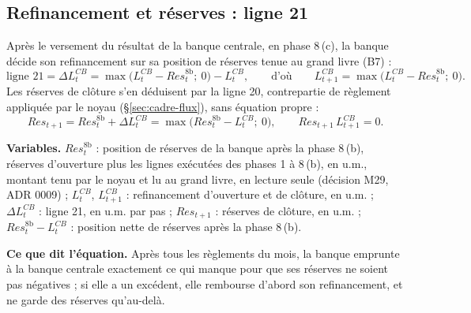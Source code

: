 \documentclass[11pt,a4paper]{article}
\newcommand{\variables}{\par\noindent\textbf{Variables.} }
\newcommand{\sens}{\par\noindent\textbf{Ce que dit l'équation.} }
\begin{document}
\subsection{Refinancement et réserves : ligne 21}
\label{sec:banque-refinancement}
\begin{proposee}
Après le versement du résultat de la banque centrale, en phase 8\,(c), la banque décide son refinancement sur sa position de réserves tenue au grand livre (B7) :
\begin{equation}
\text{ligne 21} = \Delta L^{\mathit{CB}}_t = \max\bigl(L^{\mathit{CB}}_t - \mathit{Res}^{8\mathrm{b}}_t ;\ 0\bigr) - L^{\mathit{CB}}_t, \qquad\text{d'où}\qquad L^{\mathit{CB}}_{t+1} = \max\bigl(L^{\mathit{CB}}_t - \mathit{Res}^{8\mathrm{b}}_t ;\ 0\bigr) . \tag{B7}\label{eq:banque-refinancement}
\end{equation}
Les réserves de clôture s'en déduisent par la ligne 20, contrepartie de règlement appliquée par le noyau (\S\ref{sec:cadre-flux}), sans équation propre :
\begin{equation*}
\mathit{Res}_{t+1} = \mathit{Res}^{8\mathrm{b}}_t + \Delta L^{\mathit{CB}}_t = \max\bigl(\mathit{Res}^{8\mathrm{b}}_t - L^{\mathit{CB}}_t ;\ 0\bigr), \qquad \mathit{Res}_{t+1}\, L^{\mathit{CB}}_{t+1} = 0 .
\end{equation*}
\begin{lecture}
\variables $\mathit{Res}^{8\mathrm{b}}_t$ : position de réserves de la banque après la phase 8\,(b), réserves d'ouverture plus les lignes exécutées des phases 1 à 8\,(b), en u.m., montant tenu par le noyau et lu au grand livre, en lecture seule (décision M29, ADR 0009) ; $L^{\mathit{CB}}_t$, $L^{\mathit{CB}}_{t+1}$ : refinancement d'ouverture et de clôture, en u.m. ; $\Delta L^{\mathit{CB}}_t$ : ligne 21, en u.m. par pas ; $\mathit{Res}_{t+1}$ : réserves de clôture, en u.m. ; $\mathit{Res}^{8\mathrm{b}}_t - L^{\mathit{CB}}_t$ : position nette de réserves après la phase 8\,(b).
\sens Après tous les règlements du mois, la banque emprunte à la banque centrale exactement ce qui manque pour que ses réserves ne soient pas négatives ; si elle a un excédent, elle rembourse d'abord son refinancement, et ne garde des réserves qu'au-delà.

\end{lecture}
\end{proposee}
\end{document}
